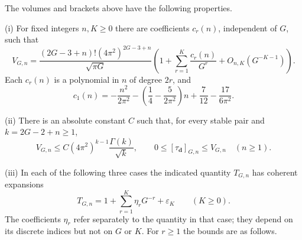 \begin{prp}[WP inputs]
\label{prp:s03:wp-inputs}
The volumes and brackets above have the following properties.

\textup{(i)} For fixed integers $n,K\geq0$ there are coefficients
$c_r(n)$, independent of $G$, such that
\begin{equation}
\label{eq:s03:fixed-n-volume}
V_{G,n}
=\frac{(2G-3+n)!(4\pi^2)^{2G-3+n}}{\sqrt{\pi G}}
 \left(1+\sum_{r=1}^K\frac{c_r(n)}{G^r}
 +O_{n,K}(G^{-K-1})\right).
\end{equation}
Each $c_r(n)$ is a polynomial in $n$ of degree $2r$, and
\begin{equation}
\label{eq:s03:c-one}
c_1(n)=-\frac{n^2}{2\pi^2}
-\left(\frac14-\frac{5}{2\pi^2}\right)n
+\frac7{12}-\frac{17}{6\pi^2}.
\end{equation}

\textup{(ii)} There is an absolute constant $C$ such that, for every
stable pair and $k=2G-2+n\geq1$,
\begin{equation}
\label{eq:s03:all-type-input}
V_{G,n}\leq C(4\pi^2)^{k-1}\frac{\Gamma(k)}{\sqrt{k}},
\qquad
0\leq[\tau_{\mathbf d}]_{G,n}\leq V_{G,n}\quad(n\geq1).
\end{equation}

\textup{(iii)} In each of the following three cases the indicated
quantity $T_{G,n}$ has coherent expansions
\begin{equation}
\label{eq:s03:hmt-form}
T_{G,n}=1+\sum_{r=1}^K\eta_rG^{-r}+\varepsilon_K
\qquad(K\geq0).
\end{equation}
The coefficients $\eta_r$ refer separately to the quantity in that case;
they depend on its discrete indices but not on $G$ or $K$.
For $r\geq1$ the bounds are as follows.


\end{prp}
